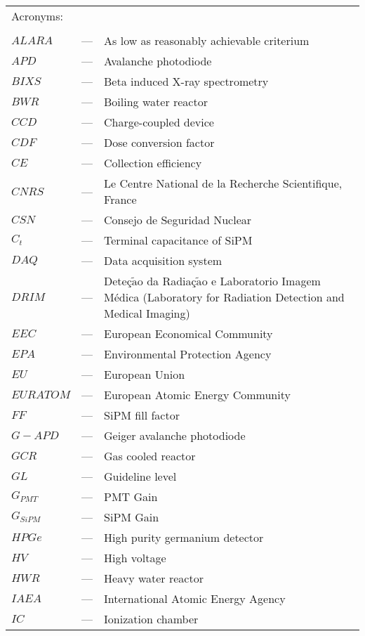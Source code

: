 \begin{longtable}{p{25mm} c p{120mm} }
\multicolumn{3}{l}{Acronyms:}\\
\\
$ALARA$ & --- & As low as reasonably achievable criterium\\
$APD$ & --- & Avalanche photodiode\\
$BIXS$ & --- & Beta induced X-ray spectrometry\\
$BWR$ & --- & Boiling water reactor\\
$CCD$ & --- & Charge-coupled device\\
$CDF$ & --- & Dose conversion factor\\
$CE$ & --- & Collection efficiency\\
$CNRS$ & --- & Le Centre National de la Recherche Scientifique, France\\
$CSN$ & --- & Consejo de Seguridad Nuclear\\
$C_t$ & --- & Terminal capacitance of SiPM\\
$DAQ$ & --- & Data acquisition system\\
$DRIM$ & --- & Deteç$\tilde{\text{a}}$o da Radiaç$\tilde{\text{a}}$o e Laboratorio Imagem Médica
\newline
(Laboratory for Radiation Detection and 
\newline
Medical Imaging)\\
$EEC$ & --- & European Economical Community\\
$EPA$ & --- & Environmental Protection Agency\\
$EU$ & --- & European Union\\
$EURATOM$ & --- & European Atomic Energy Community\\
$FF$ & --- & SiPM fill factor\\
$G-APD$ & --- & Geiger avalanche photodiode\\
$GCR$ & --- & Gas cooled reactor\\
$GL$ & --- & Guideline level\\
$G_{PMT}$ & --- & PMT Gain\\
$G_{SiPM}$ & --- & SiPM Gain\\
$HPGe$ & --- & High purity germanium detector\\
$HV$ & --- & High voltage\\
$HWR$ & --- & Heavy water reactor\\
$IAEA$ & --- & International Atomic Energy Agency \\
$IC$ & --- & Ionization chamber\\

\end{longtable}

